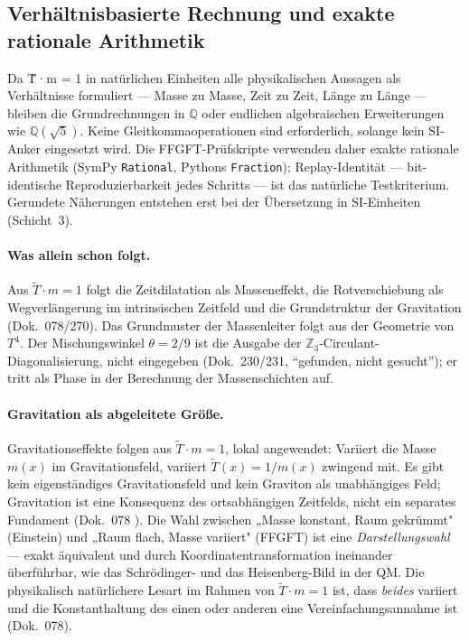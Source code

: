 \subsection*{Verhältnisbasierte Rechnung und exakte rationale Arithmetik}

Da T̃·m = 1 in natürlichen Einheiten alle physikalischen Aussagen als Verhältnisse
formuliert --- Masse zu Masse, Zeit zu Zeit, Länge zu Länge --- bleiben die
Grundrechnungen in $\mathbb{Q}$ oder endlichen algebraischen Erweiterungen wie
$\mathbb{Q}(\sqrt5)$. Keine Gleitkommaoperationen sind erforderlich, solange kein
SI-Anker eingesetzt wird. Die FFGFT-Prüfskripte verwenden daher exakte rationale
Arithmetik (SymPy \texttt{Rational}, Pythons \texttt{Fraction}); Replay-Identität
--- bit-identische Reproduzierbarkeit jedes Schritts --- ist das natürliche
Testkriterium. Gerundete Näherungen entstehen erst bei der Übersetzung in
SI-Einheiten (Schicht~3).

\paragraph{Was allein schon folgt.}
Aus $\tilde{T}\cdot m=1$ folgt die Zeitdilatation als Masseneffekt, die Rotverschiebung
als Wegverlängerung im intrinsischen Zeitfeld und die Grundstruktur der Gravitation
(Dok.~078/270). Das Grundmuster der Massenleiter folgt aus der Geometrie von $T^4$.
Der Mischungswinkel $\theta=2/9$ ist die Ausgabe der
$\mathbb{Z}_3$-Circulant-Diagonalisierung, nicht eingegeben
(Dok.~230/231, \enquote{gefunden, nicht gesucht}); er tritt als Phase
in der Berechnung der Massenschichten auf.\label{sec:schicht1}

\paragraph{Gravitation als abgeleitete Größe.}
Gravitationseffekte folgen aus $\tilde T\cdot m=1$, lokal angewendet: Variiert
die Masse $m(x)$ im Gravitationsfeld, variiert $\tilde T(x)=1/m(x)$ zwingend
mit. Es gibt kein eigenständiges Gravitationsfeld und kein Graviton als
unabhängiges Feld; Gravitation ist eine Konsequenz des ortsabhängigen Zeitfelds,
nicht ein separates Fundament (Dok.~078 \KM). Die Wahl zwischen „Masse konstant,
Raum gekrümmt" (Einstein) und „Raum flach, Masse variiert" (FFGFT) ist eine
\emph{Darstellungswahl} --- exakt äquivalent und durch Koordinatentransformation
ineinander überführbar, wie das Schrödinger- und das Heisenberg-Bild in der QM.
Die physikalisch natürlichere Lesart im Rahmen von $\tilde T\cdot m=1$ ist,
dass \emph{beides} variiert und die Konstanthaltung des einen oder anderen eine
Vereinfachungsannahme ist (Dok.~078).


